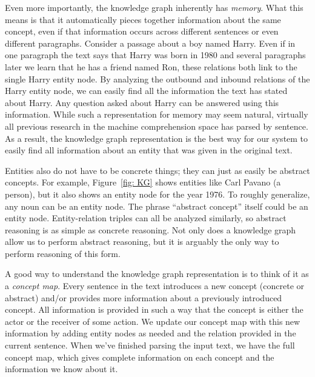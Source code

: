\documentclass[pageno]{jpaper}
\begin{document}
Even more importantly, the knowledge graph inherently has \textit{memory}. What
this means is that it automatically pieces together information about the same
concept, even if that information occurs across different sentences or even
different paragraphs. Consider a passage about a boy named Harry. Even if in one
paragraph the text says that Harry was born in 1980 and several paragraphs later
we learn that he has a friend named Ron, these relations both link to the single
Harry entity node. By analyzing the outbound and inbound relations of the Harry
entity node, we can easily find all the information the text has stated about
Harry. Any question asked about Harry can be answered using this information.
While such a representation for memory may seem natural, virtually all previous
research in the machine comprehension space has parsed by sentence. As a result,
the knowledge graph representation is the best way for our system to easily find
all information about an entity that was given in the original text.

Entities also do not have to be concrete things; they can just as easily be
abstract concepts. For example, Figure~\ref{fig: KG} shows entities like Carl
Pavano (a person), but it also shows an entity node for the year 1976. To
roughly generalize, any noun can be an entity node. The phrase ``abstract
concept'' itself could be an entity node. Entity-relation triples can all be
analyzed similarly, so abstract reasoning is as simple as concrete reasoning.
Not only does a knowledge graph allow us to perform abstract reasoning, but it
is arguably the only way to perform reasoning of this form.

A good way to understand the knowledge graph representation is to think of it as
a \textit{concept map}. Every sentence in the text introduces a new concept
(concrete or abstract) and/or provides more information about a previously
introduced concept. All information is provided in such a way that the concept
is either the actor or the receiver of some action. We update our concept map
with this new information by adding entity nodes as needed and the relation
provided in the current sentence. When we've finished parsing the input text,
we have the full concept map, which gives complete information on each concept
and the information we know about it.
\end{document}
